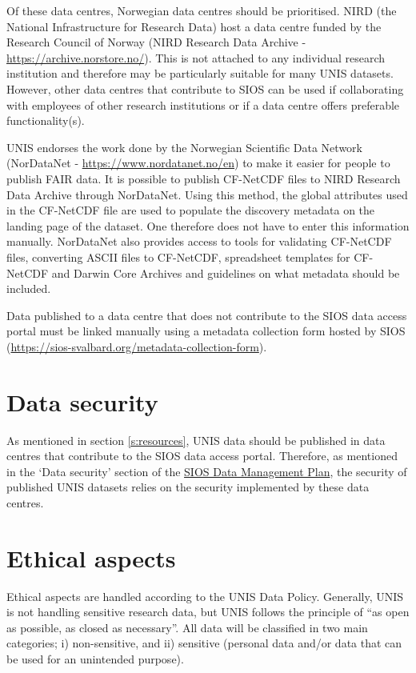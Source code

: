 \documentclass[a4paper,english, 11pt]{article}
\begin{document}
Of these data centres, Norwegian data centres should be prioritised. NIRD (the National Infrastructure for Research Data) host a data centre funded by the Research Council of Norway (NIRD Research Data Archive - \url{https://archive.norstore.no/}). This is not attached to any individual research institution and therefore may be particularly suitable for many UNIS datasets. However, other data centres that contribute to SIOS can be used if collaborating with employees of other research institutions or if a data centre offers preferable functionality(s).

UNIS endorses the work done by the Norwegian Scientific Data Network (NorDataNet - \url{https://www.nordatanet.no/en}) to make it easier for people to publish FAIR data. It is possible to publish CF-NetCDF files to NIRD Research Data Archive through NorDataNet. Using this method, the global attributes used in the CF-NetCDF file are used to populate the discovery metadata on the landing page of the dataset. One therefore does not have to enter this information manually. NorDataNet also provides access to tools for validating CF-NetCDF files, converting ASCII files to CF-NetCDF, spreadsheet templates for CF-NetCDF and Darwin Core Archives and guidelines on what metadata should be included. 

Data published to a data centre that does not contribute to the SIOS data access portal must be linked manually using a metadata collection form hosted by SIOS (\url{https://sios-svalbard.org/metadata-collection-form}).  

\section{Data security}
\label{s:security}

As mentioned in section \ref{s:resources}, UNIS data should be published in data centres that contribute to the SIOS data access portal. Therefore, as mentioned in the `Data security' section of the \href{https://sios-svalbard.org/sites/sios-svalbard.org/files/common/SIOS_Data_Management_Plan.pdf}{SIOS Data Management Plan}, the security of published UNIS datasets relies on the security implemented by these data centres.

\section{Ethical aspects}
\label{s:ethics}

Ethical aspects are handled according to the UNIS Data Policy. Generally, UNIS is not handling sensitive research data, but UNIS follows the principle of ``as open as possible, as closed as necessary''. All data will be classified in two main categories; i) non-sensitive, and ii) sensitive (personal data and/or data that can be used for an unintended purpose).
\end{document}
